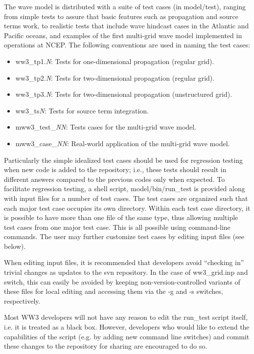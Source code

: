 \documentclass[12pt]{article}
\newcommand{\file}{\sf}
\begin{document}
The wave model is distributed with a suite of test cases
(in {\file model/test}), ranging from simple
tests to assure that basic features such as propagation and source terms work,
to realistic tests that include wave hindcast cases in the Atlantic and
Pacific oceans, and examples of the first multi-grid wave model implemented
in operations at NCEP. The following conventions are used in naming the test cases:

\begin{itemize}
\item {\file ww3\_tp1.{\it N}}: Tests for one-dimensional propagation (regular grid).
\item {\file ww3\_tp2.{\it N}}: Tests for two-dimensional propagation (regular grid).
\item {\file ww3\_tp3.{\it N}}: Tests for two-dimensional propagation (unstructured grid).
\item {\file ww3\_ts{\it N}}: Tests for source term integration.
\item {\file mww3\_test\_{\it NN}}: Tests cases for the multi-grid wave model.
\item {\file mww3\_case\_{\it NN}}: Real-world application of the multi-grid wave model.
\end{itemize}

\noindent
Particularly the simple idealized test cases should be used for regression
testing when new code is added to the repository; i.e., these tests should
result in different answers compared to the previous codes only when
expected. To facilitate regression testing, a shell script, {\file model/bin/run\_test}
is provided along with input files for a number of test cases. The test cases
are organized such that each major test case occupies its own
directory. Within each test case directory, it is possible to have more than
one file of the same type, thus allowing multiple test cases from one major
test case. This is all possible using command-line commands. The user may
further customize test cases by editing input files (see below).

When editing input files, it is recommended that developers avoid ``checking
in'' trivial changes as updates to the svn repository. In the case of {\file
  ww3\_grid.inp} and {\file switch}, this can easily be avoided by keeping
non-version-controlled variants of these files for local editing and accessing
them via the -g and -s switches, respectively.

Most WW3 developers will not have any reason to edit the {\file run\_test}
script itself, i.e. it is treated as a black box. However, developers who
would like to extend the capabilities of the script (e.g. by adding new
command line switches) and commit these changes to the repository for sharing
are encouraged to do so.
\end{document}

